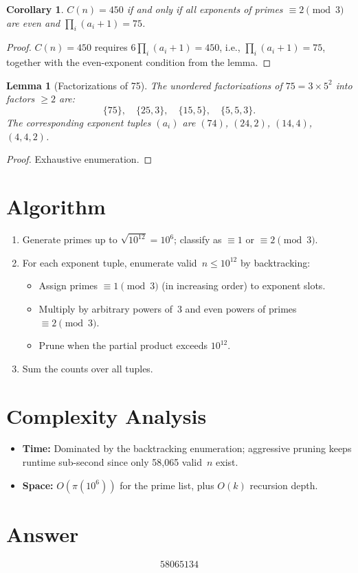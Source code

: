 \documentclass[a4paper,12pt]{article}
\newtheorem{lemma}[theorem]{Lemma}
\newtheorem{corollary}[theorem]{Corollary}
\begin{document}
\begin{corollary}
$C(n) = 450$ if and only if all exponents of primes $\equiv 2\pmod{3}$ are even and $\prod_i(a_i+1) = 75$.
\end{corollary}

\begin{proof}
$C(n) = 450$ requires $6\prod_i(a_i+1) = 450$, i.e., $\prod_i(a_i+1) = 75$, together with the even-exponent condition from the lemma.
\end{proof}

\begin{lemma}[Factorizations of 75]
The unordered factorizations of $75 = 3 \times 5^2$ into factors $\ge 2$ are:
\[
\{75\},\quad \{25,3\},\quad \{15,5\},\quad \{5,5,3\}.
\]
The corresponding exponent tuples $(a_i)$ are $(74)$, $(24,2)$, $(14,4)$, $(4,4,2)$.
\end{lemma}

\begin{proof}
Exhaustive enumeration.
\end{proof}

\section{Algorithm}

\begin{enumerate}
    \item Generate primes up to $\sqrt{10^{12}} = 10^6$; classify as $\equiv 1$ or $\equiv 2\pmod{3}$.
    \item For each exponent tuple, enumerate valid~$n \le 10^{12}$ by backtracking:
    \begin{itemize}
        \item Assign primes $\equiv 1\pmod{3}$ (in increasing order) to exponent slots.
        \item Multiply by arbitrary powers of~3 and even powers of primes $\equiv 2\pmod{3}$.
        \item Prune when the partial product exceeds $10^{12}$.
    \end{itemize}
    \item Sum the counts over all tuples.
\end{enumerate}

\section{Complexity Analysis}

\begin{itemize}
    \item \textbf{Time:} Dominated by the backtracking enumeration; aggressive pruning keeps runtime sub-second since only 58{,}065 valid~$n$ exist.
    \item \textbf{Space:} $O(\pi(10^6))$ for the prime list, plus $O(k)$ recursion depth.
\end{itemize}

\section{Answer}

\[
\boxed{58065134}
\]
\end{document}

